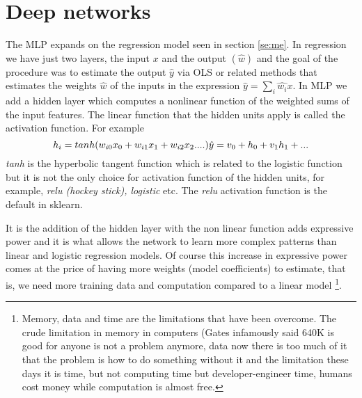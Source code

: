 \documentclass[12pt]{report}
\begin{document}
\section{Deep networks}
\label{se:deep}

The MLP expands on the regression model seen in section \ref{se:me}. In regression we have just two layers, the input $x$ and the output $(\hat{w})$ and the goal of the procedure was to estimate the output $\hat{y}$ via OLS or related methods that estimates the weights $\hat{w}$ of the inputs in the expression $\hat{y} = \sum_i \hat{w_i} x$. In MLP we add a hidden layer which computes a nonlinear function of the weighted sums of the input features. The linear function that the hidden units apply is called the activation function. For example
\begin{equation}
h_i = tanh(w_{i0}x_0 + w_{i1}x_1 + w_{i2}x_2 ....) \\
\hat{y} = v_0 + h_0 + v_1 h_1 +...
\end{equation}
\textit{tanh} is the hyperbolic tangent function which is related to the logistic function but it is not the only choice for activation function of the hidden units, for example, \textit{relu (hockey stick), logistic} etc. The \textit{relu} activation function is the default in sklearn.

It is the addition of the hidden layer with the non linear function adds expressive power and it is what allows the network to learn more complex patterns than linear and logistic regression models. Of course this increase in expressive power comes at the price of having more weights (model coefficients) to estimate, that is, we need more training data and computation compared to a linear model \footnote{Memory, data and time are the limitations that have been overcome. The crude limitation in memory in computers (Gates infamously said  640K is good for anyone is not a problem anymore, data now there is too much of it that the problem is how to do something without it and the limitation these days it is time, but not computing time but developer-engineer time, humans cost money while computation is almost free.}.
\end{document}
